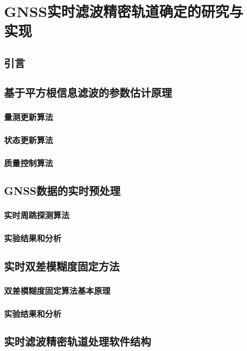 
\chapter{GNSS实时滤波精密轨道确定的研究与实现}

\section{引言}

\section{基于平方根信息滤波的参数估计原理}

\subsection{量测更新算法}

\subsection{状态更新算法}

\subsection{质量控制算法}

\section{GNSS数据的实时预处理}

\subsection{实时周跳探测算法}

\subsection{实验结果和分析}

\section{实时双差模糊度固定方法}

\subsection{双差模糊度固定算法基本原理}

\subsection{实验结果和分析}

\section{实时滤波精密轨道处理软件结构}

